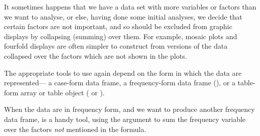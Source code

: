 \documentclass[11pt]{book}
\begin{document}
It sometimes happens that we have a data set with more variables or factors than 
we want to analyse, or else, having done some initial analyses, we decide that
certain factors are not important, and so should be excluded from graphic displays
by collapsing (summing) over them.  For example, mosaic plots and fourfold displays
are often simpler to construct from versions of the data collapsed over
the factors which are not shown in the plots.

The appropriate tools to use again depend on
the form in which the data are represented--- a case-form data frame, a
frequency-form data frame (), or a table-form array or 
table object ( or ).

When the data are in frequency form, and we want to produce another
frequency data frame,  is a handy tool, using
the argument  to sum the frequency variable over the 
factors \emph{not} mentioned in the formula.
\end{document}
